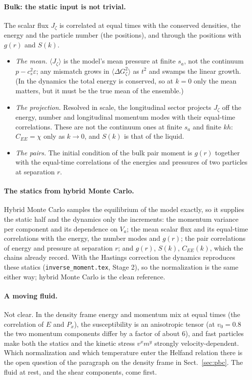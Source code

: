 \documentclass[11pt,aps,preprint,nofootinbib,superscriptaddress,tightenlines]{revtex4-2}
\def\Sect#1{Sect.~\ref{#1}}
\newcommand{\avg}[1]{\langle #1\rangle}
\let\oldparagraph\paragraph
\renewcommand{\paragraph}{\par\bigskip\oldparagraph}
\begin{document}
\paragraph{Bulk: the static input is not trivial.}  The scalar flux $J_\zeta$ is correlated at equal times with the conserved densities, the
energy and the particle number (the positions), and through the positions with $g(r)$ and $S(k)$.
\begin{itemize}
\item \emph{The mean.}  $\avg{J_\zeta}$ is the model's mean pressure at finite $s_a$, not the continuum $p-c_s^2\varepsilon$; any mismatch grows in
  $\avg{\Delta G_\zeta^2}$ as $t^2$ and swamps the linear growth.  (In the dynamics the total energy is conserved, so at $k=0$ only the mean
  matters, but it must be the true mean of the ensemble.)
\item \emph{The projection.}  Resolved in scale, the longitudinal sector projects $J_\zeta$ off the energy, number and longitudinal momentum
  modes with their equal-time correlations.  These are not the continuum ones at finite $s_a$ and finite $kh$: $C_{EE}=\chi$ only as $k\to0$, and
  $S(k)$ is that of the liquid.
\item \emph{The pairs.}  The initial condition of the bulk pair moment is $g(r)$ together with the equal-time correlations of the energies and
  pressures of two particles at separation $r$.
\end{itemize}

\paragraph{The statics from hybrid Monte Carlo.}  Hybrid Monte Carlo samples the equilibrium of the model exactly, so it supplies the static
half and the dynamics only the increments: the momentum variance per component and its dependence on $V_a$; the mean scalar flux and its
equal-time correlations with the energy, the number modes and $g(r)$; the pair correlations of energy and pressure at separation $r$; and
$g(r)$, $S(k)$, $C_{EE}(k)$, which the chains already record.  With the Hastings correction the dynamics reproduces these statics
(\texttt{inverse\_moment.tex}, Stage 2), so the normalization is the same either way; hybrid Monte Carlo is the clean reference.

\paragraph{A moving fluid.}  Not clear.  In the density frame energy and momentum mix at equal times (the correlation of $E$ and $P_x$), the
susceptibility is an anisotropic tensor (at $v_0=0.8$ the two momentum components differ by a factor of about $6$), and fast particles
make both the statics and the kinetic stress $v^xm^y$ strongly velocity-dependent.  Which normalization and which temperature enter the
Helfand relation there is the open question of the paragraph on the density frame in \Sect{sec:pbc}.  The fluid at rest, and the
shear components, come first.
\end{document}
